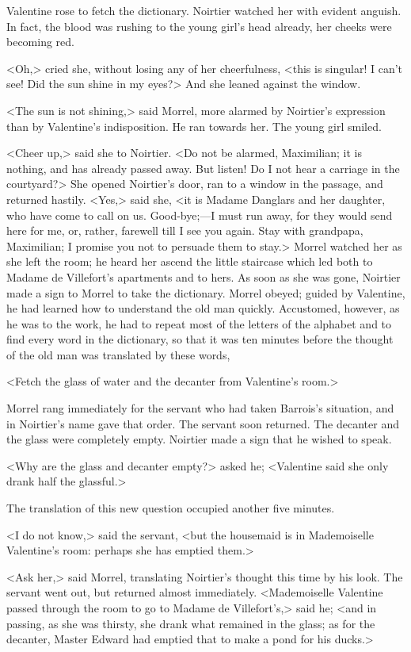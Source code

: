  Valentine rose to fetch the dictionary. Noirtier watched her with evident anguish. In fact, the blood was rushing to the young girl's head already, her cheeks were becoming red. 

 <Oh,> cried she, without losing any of her cheerfulness, <this is singular! I can't see! Did the sun shine in my eyes?> And she leaned against the window. 

 <The sun is not shining,> said Morrel, more alarmed by Noirtier's expression than by Valentine's indisposition. He ran towards her. The young girl smiled. 

 <Cheer up,> said she to Noirtier. <Do not be alarmed, Maximilian; it is nothing, and has already passed away. But listen! Do I not hear a carriage in the courtyard?> She opened Noirtier's door, ran to a window in the passage, and returned hastily. <Yes,> said she, <it is Madame Danglars and her daughter, who have come to call on us. Good-bye;—I must run away, for they would send here for me, or, rather, farewell till I see you again. Stay with grandpapa, Maximilian; I promise you not to persuade them to stay.>  Morrel watched her as she left the room; he heard her ascend the little staircase which led both to Madame de Villefort's apartments and to hers. As soon as she was gone, Noirtier made a sign to Morrel to take the dictionary. Morrel obeyed; guided by Valentine, he had learned how to understand the old man quickly. Accustomed, however, as he was to the work, he had to repeat most of the letters of the alphabet and to find every word in the dictionary, so that it was ten minutes before the thought of the old man was translated by these words, 

 <Fetch the glass of water and the decanter from Valentine's room.> 

 Morrel rang immediately for the servant who had taken Barrois's situation, and in Noirtier's name gave that order. The servant soon returned. The decanter and the glass were completely empty. Noirtier made a sign that he wished to speak. 

 <Why are the glass and decanter empty?> asked he; <Valentine said she only drank half the glassful.> 

 The translation of this new question occupied another five minutes. 

 <I do not know,> said the servant, <but the housemaid is in Mademoiselle Valentine's room: perhaps she has emptied them.> 

 <Ask her,> said Morrel, translating Noirtier's thought this time by his look. The servant went out, but returned almost immediately. <Mademoiselle Valentine passed through the room to go to Madame de Villefort's,> said he; <and in passing, as she was thirsty, she drank what remained in the glass; as for the decanter, Master Edward had emptied that to make a pond for his ducks.> 

